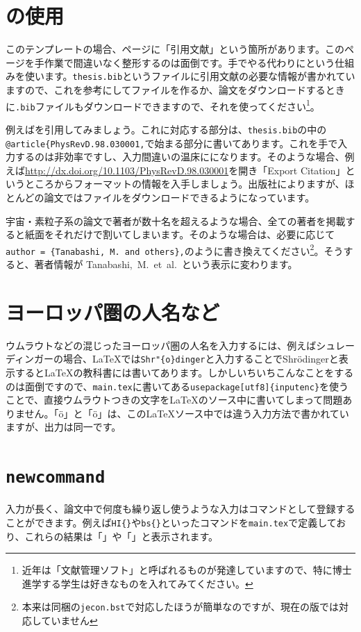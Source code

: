 \section{\BibTeX{}の使用}
このテンプレートの場合、\pageref{page:bib}ページに「引用文献」という箇所があります。このページを手作業で間違いなく整形するのは面倒です。手でやる代わりに\BibTeX{}という仕組みを使います。\texttt{thesis.bib}というファイルに引用文献の必要な情報が書かれていますので、これを参考にして\BibTeX{}ファイルを作るか、論文をダウンロードするときに\texttt{.bib}ファイルもダウンロードできますので、それを使ってください\footnote{近年は「文献管理ソフト」と呼ばれるものが発達していますので、特に博士進学する学生は好きなものを入れてみてください。}。

例えば\cite{PhysRevD.98.030001}を引用してみましょう。これに対応する部分は、\texttt{thesis.bib}の中の\texttt{@article\{PhysRevD.98.030001,}で始まる部分に書いてあります。これを手で入力するのは非効率ですし、入力間違いの温床にになります。そのような場合、例えば\url{http://dx.doi.org/10.1103/PhysRevD.98.030001}を開き「Export Citation」というところから\BibTeX{}フォーマットの情報を入手しましょう。出版社によりますが、ほとんどの論文では\BibTeX{}ファイルをダウンロードできるようになっています。

宇宙・素粒子系の論文で著者が数十名を超えるような場合、全ての著者を掲載すると紙面をそれだけで割いてしまいます。そのような場合は、必要に応じて\texttt{author = \{Tanabashi, M. and others\},}のように書き換えてください\footnote{本来は同梱の\texttt{jecon.bst}で対応したほうが簡単なのですが、現在の版では対応していません}。そうすると、著者情報が Tanabashi,~M.~et~al.\ という表示に変わります。

\section{ヨーロッパ圏の人名など}
ウムラウトなどの混じったヨーロッパ圏の人名を入力するには、例えばシュレーディンガーの場合、\LaTeX{}では\texttt{Shr\bs{}"\{o\}dinger}と入力することでShr\"{o}dingerと表示すると\LaTeX{}の教科書には書いてあります。しかしいちいちこんなことをするのは面倒ですので、\texttt{main.tex}に書いてある\texttt{\bs{}usepackage[utf8]\{inputenc\}}を使うことで、直接ウムラウトつきの文字を\LaTeX{}のソース中に書いてしまって問題ありません。「ö」と「\"{o}」は、この\LaTeX{}ソース中では違う入力方法で書かれていますが、出力は同一です。

\section{\texttt{newcommand}}

入力が長く、論文中で何度も繰り返し使うような入力はコマンドとして登録することができます。例えば\texttt{\bs{}HI\{\}}や\texttt{\bs{}bs\{\}}といったコマンドを\texttt{main.tex}で定義しており、これらの結果は「\HI{}」や「\bs{}」と表示されます。
